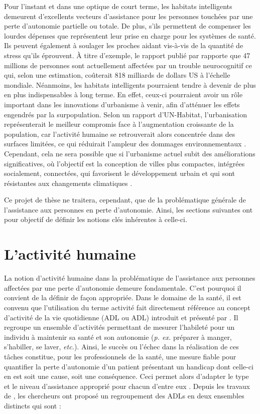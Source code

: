 Pour l’instant et dans une optique de court terme, les habitats intelligents demeurent d’excellents vecteurs d’assistance pour les personnes touchées par une perte d’autonomie partielle ou totale. De plus, s'ils permettent de compenser les lourdes dépenses que représentent leur prise en charge pour les systèmes de santé. Ils peuvent également à soulager les proches aidant vis-à-vis de la quantité de stress qu’ils éprouvent. À titre d'exemple, le rapport publié par \cite{Prince2016} rapporte que 47 millions de personnes sont actuellement affectées par un trouble neurocognitif ce qui, selon une estimation, coûterait 818 milliards de dollars US à l'échelle mondiale. Néanmoins, les habitats intelligents pourraient tendre à devenir de plus en plus indispensables à long terme. En effet, ceux-ci pourraient avoir un rôle important dans les innovations d’urbanisme à venir, afin d’atténuer les effets engendrés par la surpopulation. Selon un rapport d’UN-Habitat, l’urbanisation représenterait le meilleur compromis face à l’augmentation croissante de la population, car l’activité humaine se retrouverait alors concentrée dans des surfaces limitées, ce qui réduirait l’ampleur des dommages environnementaux \citep{UNFPA2007}. Cependant, cela ne sera possible que si l’urbanisme actuel subit des améliorations significatives, où l’objectif est la conception de villes plus compactes, intégrées socialement, connectées, qui favorisent le développement urbain et qui sont résistantes aux changements climatiques \citep{UNFPA2007}.

Ce projet de thèse ne traitera, cependant, que de la problématique générale de l'assistance aux personnes en perte d'autonomie. Ainsi, les sections suivantes ont pour objectif de définir les notions clés inhérentes à celle-ci.

\section{L'activité humaine}

La notion d'activité humaine dans la problématique de l'assistance aux personnes affectées par une perte d'autonomie demeure fondamentale. C'est pourquoi il convient de la définir de façon appropriée. Dans le domaine de la santé, il est convenu que l'utilisation du terme activité fait directement référence au concept d'activité de la vie quotidienne (\acl{ADL} ou \acs{ADL}) introduit et présenté par \cite{Katz1963}. Il regroupe un ensemble d'activités permettant de mesurer l'habileté pour un individu à maintenir sa santé et son autonomie (\textit{p. ex.} préparer à manger, s'habiller, se laver, \textit{etc.}). Ainsi, le succès ou l'échec dans la réalisation de ces tâches constitue, pour les professionnels de la santé, une mesure fiable pour quantifier la perte d'autonomie d'un patient présentant un handicap dont celle-ci en est soit une cause, soit une conséquence. Ceci permet alors d'adapter le type et le niveau d'assistance approprié pour chacun d'entre eux \citep{Giovannetti2002}. Depuis les travaux de \cite{Katz1963}, les chercheurs \cite{Lawton1969} ont proposé un regroupement des \acs{ADL}s en deux ensembles distincts qui sont :


